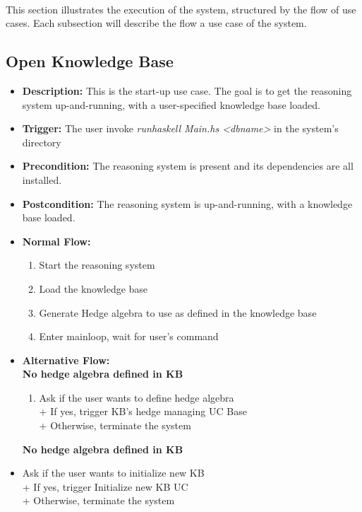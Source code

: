 \documentclass[../gr-final.tex]{subfiles}
\begin{document}
\paragraph{} This section illustrates the execution of the
system, structured by the flow of use cases. Each subsection will describe the 
flow a use case of the system. 
\subsection{Open Knowledge Base}
\begin{itemize}
  \item {\bfseries Description:} This is the start-up use case.
    The goal is to get the reasoning system up-and-running, with a
    user-specified knowledge base loaded.   
  \item {\bfseries Trigger:} The user invoke {\em runhaskell
    Main.hs <dbname>} in the system's directory
  \item {\bfseries Precondition:} The reasoning system is present and its
    dependencies are all installed.    
  \item {\bfseries Postcondition:} The reasoning system is
    up-and-running, with a knowledge base loaded.
  \item {\bfseries Normal Flow:}
    \begin{enumerate}
      \item Start the reasoning system
      \item Load the knowledge base
      \item Generate Hedge algebra to use as defined in the
        knowledge base
      \item Enter mainloop, wait for user's command
    \end{enumerate}
  \item {\bfseries Alternative Flow:}
    \\{\bfseries No hedge algebra defined in KB}
    \begin{enumerate}
      \item Ask if the user wants to define hedge algebra\\
            \indent + If yes, trigger KB's hedge managing UC
            Base\\
            \indent + Otherwise, terminate the system
    \end{enumerate}
    {\bfseries No hedge algebra defined in KB}
      \item Ask if the user wants to initialize new KB\\
          \indent + If yes, trigger Initialize new KB UC\\
          \indent + Otherwise, terminate the system


\end{itemize}
\end{document}
